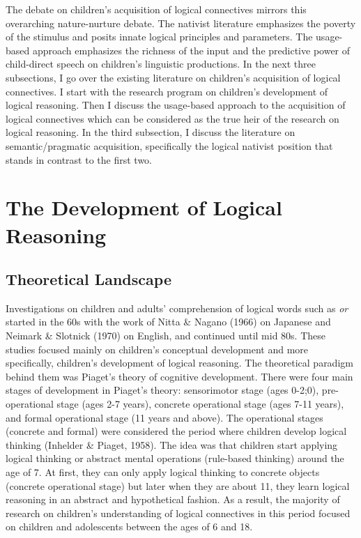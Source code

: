 \documentclass[oneside]{report}
\theoremstyle{definition}
\theoremstyle{definition}
\theoremstyle{definition}
\theoremstyle{remark}
\begin{document}
The debate on children's acquisition of logical connectives mirrors this
overarching nature-nurture debate. The nativist literature emphasizes
the poverty of the stimulus and posits innate logical principles and
parameters. The usage-based approach emphasizes the richness of the
input and the predictive power of child-direct speech on children's
linguistic productions. In the next three subsections, I go over the
existing literature on children's acquisition of logical connectives. I
start with the research program on children's development of logical
reasoning. Then I discuss the usage-based approach to the acquisition of
logical connectives which can be considered as the true heir of the
research on logical reasoning. In the third subsection, I discuss the
literature on semantic/pragmatic acquisition, specifically the logical
nativist position that stands in contrast to the first two.

\section{The Development of Logical
Reasoning}\label{the-development-of-logical-reasoning}

\subsection{Theoretical Landscape}\label{theoretical-landscape}

Investigations on children and adults' comprehension of logical words
such as \emph{or} started in the 60s with the work of Nitta \& Nagano
(1966) on Japanese and Neimark \& Slotnick (1970) on English, and
continued until mid 80s. These studies focused mainly on children's
conceptual development and more specifically, children's development of
logical reasoning. The theoretical paradigm behind them was Piaget's
theory of cognitive development. There were four main stages of
development in Piaget's theory: sensorimotor stage (ages 0-2;0),
pre-operational stage (ages 2-7 years), concrete operational stage (ages
7-11 years), and formal operational stage (11 years and above). The
operational stages (concrete and formal) were considered the period
where children develop logical thinking (Inhelder \& Piaget, 1958). The
idea was that children start applying logical thinking or abstract
mental operations (rule-based thinking) around the age of 7. At first,
they can only apply logical thinking to concrete objects (concrete
operational stage) but later when they are about 11, they learn logical
reasoning in an abstract and hypothetical fashion. As a result, the
majority of research on children's understanding of logical connectives
in this period focused on children and adolescents between the ages of 6
and 18.
\end{document}
